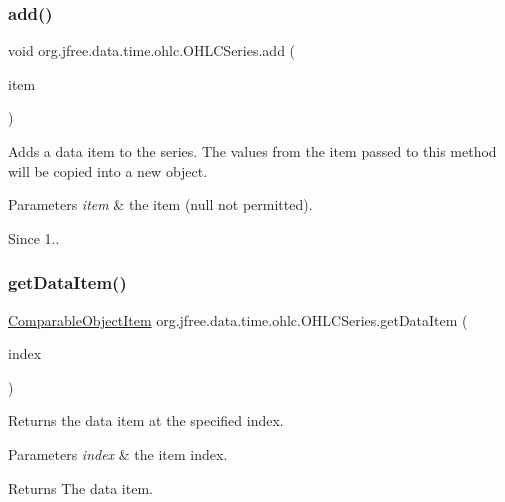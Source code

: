 \subsubsection{\texorpdfstring{add()}{add()}\hspace{0.1cm}{\footnotesize\ttfamily [2/2]}}
{\footnotesize\ttfamily void org.\+jfree.\+data.\+time.\+ohlc.\+O\+H\+L\+C\+Series.\+add (\begin{DoxyParamCaption}\item[{\mbox{\hyperlink{classorg_1_1jfree_1_1data_1_1time_1_1ohlc_1_1_o_h_l_c_item}{O\+H\+L\+C\+Item}}}]{item }\end{DoxyParamCaption})}

Adds a data item to the series. The values from the item passed to this method will be copied into a new object.


\begin{DoxyParams}{Parameters}
{\em item} & the item ({\ttfamily null} not permitted).\\
\hline
\end{DoxyParams}
\begin{DoxySince}{Since}
1.. 
\end{DoxySince}
\mbox{\label{classorg_1_1jfree_1_1data_1_1time_1_1ohlc_1_1_o_h_l_c_series_a55207c2cbe1624465f00101b3e32439c}} 
\subsubsection{\texorpdfstring{get\+Data\+Item()}{getDataItem()}}
{\footnotesize\ttfamily \mbox{\hyperlink{classorg_1_1jfree_1_1data_1_1_comparable_object_item}{Comparable\+Object\+Item}} org.\+jfree.\+data.\+time.\+ohlc.\+O\+H\+L\+C\+Series.\+get\+Data\+Item (\begin{DoxyParamCaption}\item[{int}]{index }\end{DoxyParamCaption})}

Returns the data item at the specified index.


\begin{DoxyParams}{Parameters}
{\em index} & the item index.\\
\hline
\end{DoxyParams}
\begin{DoxyReturn}{Returns}
The data item. 
\end{DoxyReturn}
\mbox{\label{classorg_1_1jfree_1_1data_1_1time_1_1ohlc_1_1_o_h_l_c_series_aff62f6333a35fc48fc65b8ce1742ccbb}} 

